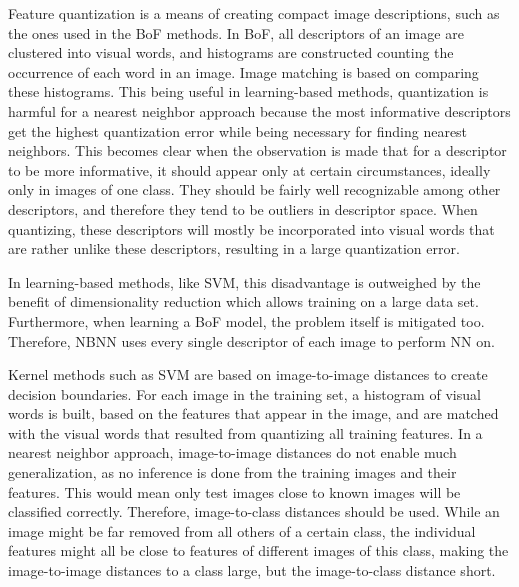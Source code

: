 Feature quantization is a means of creating compact image descriptions, such as the ones used in the BoF methods. In BoF, all descriptors of an image are clustered into visual words, and histograms are constructed counting the occurrence of each word in an image. Image matching is based on comparing these histograms. This being useful in learning-based methods, quantization is harmful for a nearest neighbor approach because the most informative descriptors get the highest quantization error while being necessary for finding nearest neighbors. This becomes clear when the observation is made that for a descriptor to be more informative, it should appear only at certain circumstances, ideally only in images of one class. They should be fairly well recognizable among other descriptors, and therefore they tend to be outliers in descriptor space. When quantizing, these descriptors will mostly be incorporated into visual words that are rather unlike these descriptors, resulting in a large quantization error.

In learning-based methods, like SVM, this disadvantage is outweighed by the benefit of dimensionality reduction which allows training on a large data set. Furthermore, when learning a BoF model, the problem itself is mitigated too. Therefore, NBNN uses every single descriptor of each image to perform NN on.

Kernel methods such as SVM are based on image-to-image distances to create decision boundaries. For each image in the training set, a histogram of visual words is built, based on the features that appear in the image, and are matched with the visual words that resulted from quantizing all training features. 
In a nearest neighbor approach, image-to-image distances do not enable much generalization, as no inference is done from the training images and their features. This would mean only test images close to known images will be classified correctly. Therefore, image-to-class distances should be used. While an image might be far removed from all others of a certain class, the individual features might all be close to features of different images of this class, making the image-to-image distances to a class large, but the image-to-class distance short. \cite{wang2009learning} 

\begin{figure}[hbt]
    \centering
\end{figure}

